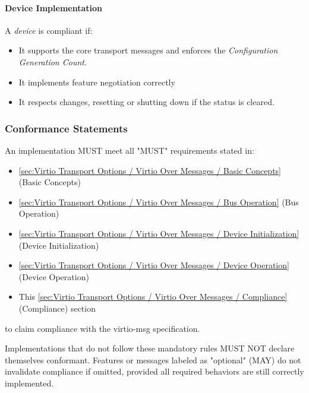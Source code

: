 \paragraph{Device Implementation}
A \emph{device} is compliant if:
\begin{itemize}
  \item It supports the core transport messages and enforces the
    \emph{Configuration Generation Count}.
  \item It implements feature negotiation correctly
  \item It respects  changes, resetting or shutting
    down if the status is cleared.
\end{itemize}

\subsubsection{Conformance Statements}
\label{sec:Virtio Transport Options / Virtio Over Messages / Compliance / Conformance}

An implementation MUST meet all "MUST" requirements stated in:
\begin{itemize}
  \item \ref{sec:Virtio Transport Options / Virtio Over Messages / Basic Concepts} (Basic Concepts)
  \item \ref{sec:Virtio Transport Options / Virtio Over Messages / Bus Operation} (Bus Operation)
  \item \ref{sec:Virtio Transport Options / Virtio Over Messages / Device Initialization} (Device Initialization)
  \item \ref{sec:Virtio Transport Options / Virtio Over Messages / Device Operation} (Device Operation)
  \item This \ref{sec:Virtio Transport Options / Virtio Over Messages / Compliance} (Compliance) section
\end{itemize}
to claim compliance with the virtio-msg specification.

Implementations that do not follow these mandatory rules MUST NOT declare
themselves conformant. Features or messages labeled as "optional" (MAY)
do not invalidate compliance if omitted, provided all required behaviors are
still correctly implemented.
